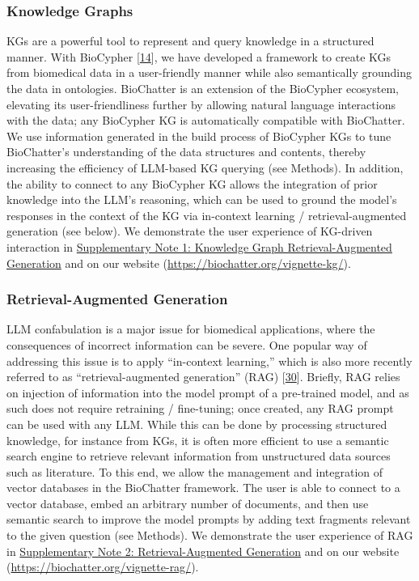\hypertarget{knowledge-graphs}{%
\subsubsection{Knowledge Graphs}\label{knowledge-graphs}}

KGs are a powerful tool to represent and query knowledge in a structured manner.
With BioCypher {[}\protect\hyperlink{ref-tr1XjZ1R}{14}{]}, we have developed a framework to create KGs from biomedical data in a user-friendly manner while also semantically grounding the data in ontologies.
BioChatter is an extension of the BioCypher ecosystem, elevating its user-friendliness further by allowing natural language interactions with the data; any BioCypher KG is automatically compatible with BioChatter.
We use information generated in the build process of BioCypher KGs to tune BioChatter's understanding of the data structures and contents, thereby increasing the efficiency of LLM-based KG querying (see Methods).
In addition, the ability to connect to any BioCypher KG allows the integration of prior knowledge into the LLM's reasoning, which can be used to ground the model's responses in the context of the KG via in-context learning / retrieval-augmented generation (see below).
We demonstrate the user experience of KG-driven interaction in \protect\hyperlink{supplementary-note-1-knowledge-graph-retrieval-augmented-generation}{Supplementary Note 1: Knowledge Graph Retrieval-Augmented Generation} and on our website (\url{https://biochatter.org/vignette-kg/}).

\hypertarget{retrieval-augmented-generation}{%
\subsubsection{Retrieval-Augmented Generation}\label{retrieval-augmented-generation}}

LLM confabulation is a major issue for biomedical applications, where the consequences of incorrect information can be severe.
One popular way of addressing this issue is to apply ``in-context learning,'' which is also more recently referred to as ``retrieval-augmented generation'' (RAG) {[}\protect\hyperlink{ref-1BzQcjRCZ}{30}{]}.
Briefly, RAG relies on injection of information into the model prompt of a pre-trained model, and as such does not require retraining / fine-tuning; once created, any RAG prompt can be used with any LLM.
While this can be done by processing structured knowledge, for instance from KGs, it is often more efficient to use a semantic search engine to retrieve relevant information from unstructured data sources such as literature.
To this end, we allow the management and integration of vector databases in the BioChatter framework.
The user is able to connect to a vector database, embed an arbitrary number of documents, and then use semantic search to improve the model prompts by adding text fragments relevant to the given question (see Methods).
We demonstrate the user experience of RAG in \protect\hyperlink{supplementary-note-2-retrieval-augmented-generation}{Supplementary Note 2: Retrieval-Augmented Generation} and on our website (\url{https://biochatter.org/vignette-rag/}).

